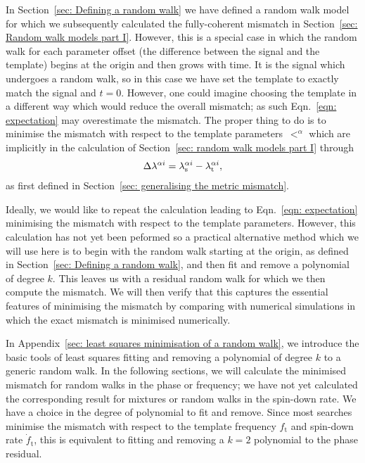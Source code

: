 In Section~\ref{sec: Defining a random walk} we have defined a random walk
model for which we subsequently calculated the fully-coherent mismatch in
Section~\ref{sec: Random walk models part I}. However, this is a special case
in which the random walk for each parameter offset (the difference between the
signal and the template) begins at the origin and then grows with time. It is
the signal which undergoes a random walk, so in this case we have set the
template to exactly match the signal and $t=0$. However, one could imagine choosing
the template in a different way which would reduce the overall mismatch; as such
Eqn.~\eqref{eqn: expectation} may overestimate the mismatch. The proper thing to
do is to minimise the mismatch with respect to the
template parameters~$\lt^{\alpha}$ which are implicitly in the calculation of
Section~\ref{sec: random walk models part I} through
\begin{align}
\Delta \lambda^{\alpha i} = {\lambda}_\textrm{s}^{\alpha i} - {\lambda}_\textrm{t}^{\alpha i},
\end{align}
as first defined in Section~\ref{sec: generalising the metric mismatch}.

Ideally, we would like to repeat the calculation leading to Eqn.~\eqref{eqn:
expectation} minimising the mismatch with respect to the template parameters.
However, this calculation has not yet been peformed so a practical alternative
method which we will use here is to begin with the random walk starting at the
origin, as defined in Section~\ref{sec: Defining a random walk}, and then fit and
remove a polynomial of degree $k$. This leaves us with a residual random walk for
which we then compute the mismatch. We will then verify that this captures the
essential features of minimising the mismatch by comparing with numerical
simulations in which the exact mismatch is minimised numerically.

In Appendix~\ref{sec: least squares minimisation of a random walk}, we
introduce the basic tools of least squares fitting and removing a polynomial of
degree $k$ to a generic random walk. In the following sections, we will
calculate the minimised mismatch for random walks in the phase or frequency; we
have not yet calculated the corresponding result for mixtures or random walks
in the spin-down rate. We have a choice in the degree of polynomial to fit and
remove. Since most searches minimise the mismatch with respect to the template
frequency $f_\textrm{t}$ and spin-down rate $\dot{f}_{\textrm{t}}$, this is
equivalent to fitting and removing a $k=2$ polynomial to the phase residual.

